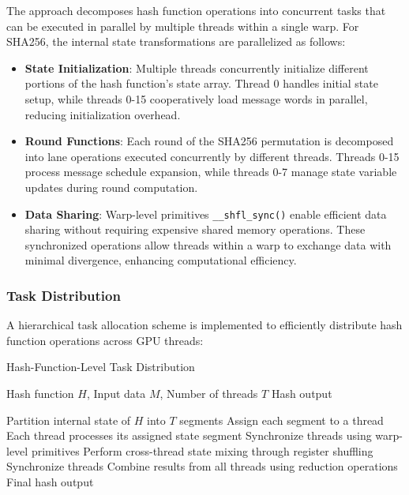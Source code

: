 \documentclass[journal]{IEEEtran}
\begin{document}

The approach decomposes hash function operations into concurrent tasks that can be executed in parallel by multiple threads within a single warp. For SHA256, the internal state transformations are parallelized as follows:

\begin{itemize}
  \item \textbf{State Initialization}: Multiple threads concurrently initialize different portions of the hash function's state array. Thread 0 handles initial state setup, while threads 0-15 cooperatively load message words in parallel, reducing initialization overhead.

  \item \textbf{Round Functions}: Each round of the SHA256 permutation is decomposed into lane operations executed concurrently by different threads. Threads 0-15 process message schedule expansion, while threads 0-7 manage state variable updates during round computation.

  \item \textbf{Data Sharing}: Warp-level primitives  \texttt{\_\_shfl\_sync()} enable efficient data sharing without requiring expensive shared memory operations. These synchronized operations allow threads within a warp to exchange data with minimal divergence, enhancing computational efficiency.
\end{itemize}

\subsubsection{Task Distribution }

A hierarchical task allocation scheme is implemented to efficiently distribute hash function operations across GPU threads:

\begin{algorithm}
  \caption{Hash-Function-Level Task Distribution}
  \begin{algorithmic}[1]
    \REQUIRE Hash function $H$, Input data $M$, Number of threads $T$
    \ENSURE Hash output

    \STATE Partition internal state of $H$ into $T$ segments
    \STATE Assign each segment to a thread
    \STATE Each thread processes its assigned state segment
    \STATE Synchronize threads using warp-level primitives
    \STATE Perform cross-thread state mixing through register shuffling
    \STATE Synchronize threads
    \ENDFOR
    \STATE Combine results from all threads using reduction operations
    \RETURN Final hash output
  \end{algorithmic}
\end{algorithm}
\end{document}

